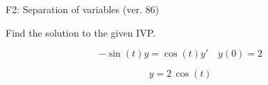 \begin{exercise}
  \begin{exerciseTitle}F2: Separation of variables (ver. 86)\end{exerciseTitle}
  \begin{exerciseStatement}
    
Find the solution to the given IVP.

    
\[-\sin\left(t\right) y= \cos\left(t\right) y'\hspace{1em} y\left( 0 \right)= 2\]

  \end{exerciseStatement}
  \begin{exerciseAnswer}
    
\[y= 2 \, \cos\left(t\right)\]

  \end{exerciseAnswer}
\end{exercise}
